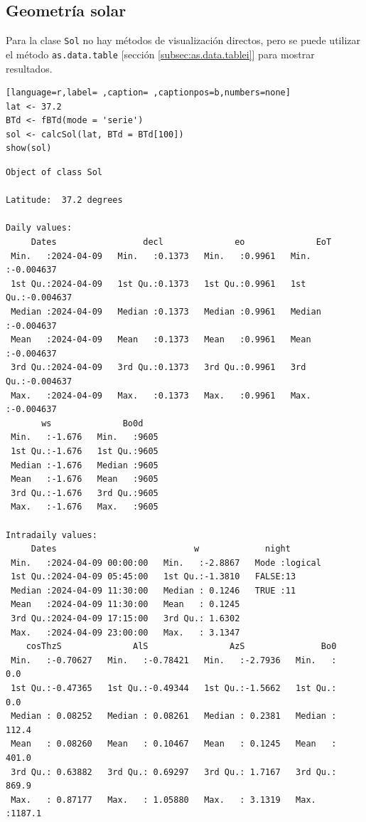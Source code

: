 \subsection{Geometría solar}
\label{sec:org5cca07f}
Para la clase \texttt{Sol} no hay métodos de visualización directos, pero se puede utilizar el método \texttt{as.data.table} [sección \ref{subsec:as.data.tablei}] para mostrar resultados.
\begin{lstlisting}[language=r,label= ,caption= ,captionpos=b,numbers=none]
lat <- 37.2
BTd <- fBTd(mode = 'serie')
sol <- calcSol(lat, BTd = BTd[100])
show(sol)
\end{lstlisting}

\begin{verbatim}
Object of class Sol 

Latitude:  37.2 degrees

Daily values:
     Dates                 decl              eo              EoT           
 Min.   :2024-04-09   Min.   :0.1373   Min.   :0.9961   Min.   :-0.004637  
 1st Qu.:2024-04-09   1st Qu.:0.1373   1st Qu.:0.9961   1st Qu.:-0.004637  
 Median :2024-04-09   Median :0.1373   Median :0.9961   Median :-0.004637  
 Mean   :2024-04-09   Mean   :0.1373   Mean   :0.9961   Mean   :-0.004637  
 3rd Qu.:2024-04-09   3rd Qu.:0.1373   3rd Qu.:0.9961   3rd Qu.:-0.004637  
 Max.   :2024-04-09   Max.   :0.1373   Max.   :0.9961   Max.   :-0.004637  
       ws              Bo0d     
 Min.   :-1.676   Min.   :9605  
 1st Qu.:-1.676   1st Qu.:9605  
 Median :-1.676   Median :9605  
 Mean   :-1.676   Mean   :9605  
 3rd Qu.:-1.676   3rd Qu.:9605  
 Max.   :-1.676   Max.   :9605  

Intradaily values: 
     Dates                           w             night        
 Min.   :2024-04-09 00:00:00   Min.   :-2.8867   Mode :logical  
 1st Qu.:2024-04-09 05:45:00   1st Qu.:-1.3810   FALSE:13       
 Median :2024-04-09 11:30:00   Median : 0.1246   TRUE :11       
 Mean   :2024-04-09 11:30:00   Mean   : 0.1245                  
 3rd Qu.:2024-04-09 17:15:00   3rd Qu.: 1.6302                  
 Max.   :2024-04-09 23:00:00   Max.   : 3.1347                  
    cosThzS              AlS                AzS               Bo0        
 Min.   :-0.70627   Min.   :-0.78421   Min.   :-2.7936   Min.   :   0.0  
 1st Qu.:-0.47365   1st Qu.:-0.49344   1st Qu.:-1.5662   1st Qu.:   0.0  
 Median : 0.08252   Median : 0.08261   Median : 0.2381   Median : 112.4  
 Mean   : 0.08260   Mean   : 0.10467   Mean   : 0.1245   Mean   : 401.0  
 3rd Qu.: 0.63882   3rd Qu.: 0.69297   3rd Qu.: 1.7167   3rd Qu.: 869.9  
 Max.   : 0.87177   Max.   : 1.05880   Max.   : 3.1319   Max.   :1187.1
\end{verbatim}


